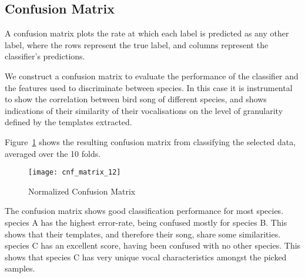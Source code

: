 \subsection{Confusion Matrix}
A confusion matrix plots the rate at which each label is predicted as any other
label, where the rows represent the true label, and columns represent the
classifier's predictions.

We construct a confusion matrix to evaluate the performance of the classifier
and the features used to discriminate between species.
In this case it is instrumental to show the correlation between bird song of
different species, and shows indications of their similarity of their
vocalisations on the level of granularity defined by the templates extracted.

Figure~\ref{fig:cnf12} shows the resulting confusion matrix from classifying the
selected data, averaged over the 10 folds.

\begin{figure}[!htb]
  \centering
  \texttt{[image: cnf\_matrix\_12]}
  \caption{Normalized Confusion Matrix}\label{fig:cnf12}
\end{figure}

The confusion matrix shows good classification performance for most species.\\

species A has the highest error-rate, being confused mostly for species B.
This shows that their templates, and therefore their song, share some
similarities.\\

species C has an excellent score, having been confused with no other species.
This shows that species C has very unique vocal characteristics amongst the
picked samples.
